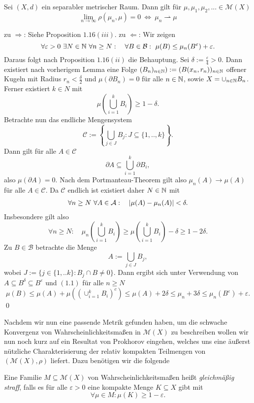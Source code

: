 \begin{theorem}
    Sei $(X,d)$ ein separabler metrischer Raum. Dann gilt für $\mu, \mu_1, \mu_2, ... \in \mathcal{M}(X)$
    $$
        \lim_{n \to \infty} \rho(\mu_n, \mu) = 0 \ \iff \ \mu_n \rightharpoonup \mu 
    $$
\end{theorem}

\begin{proof*}
    zu $\Rightarrow$: Siehe Proposition $1.16(iii)$.
    \newline 
    zu $\Leftarrow$:  Wir zeigen
    $$
        \forall \varepsilon > 0 \ \exists N \in \N \ \forall n \geq N: \quad \forall B \in \mathcal{B}: \  \mu(B) \leq \mu_n(B^{\varepsilon}) + \varepsilon. 
    $$
    Daraus folgt nach Proposition $1.16(ii)$ die Behauptung. Sei $\delta := \frac{\varepsilon}{4} > 0$. 
    Dann existiert nach vorherigem Lemma eine Folge $(B_n)_{n \in \mathbb{N}}) := (B(x_n, r_n))_{n \in \mathbb{N}}$ offener Kugeln mit Radius $r_n < \frac{\delta}{2}$  
    und $\mu(\partial B_n) = 0$ für alle $n \in \mathbb{N}$, sowie $X = \cup_{n \in  \mathbb{N}}B_n$. Ferner existiert $k \in N$ mit
    $$
        \mu\left(\bigcup_{i=1}^k B_i\right) \geq 1 - \delta. 
    $$
    Betrachte nun das endliche Mengensystem 
    $$
        \mathcal{C} := \left\{ \bigcup_{j \in J}B_j : J \subseteq \{1,..,k\}\right\}. 
    $$
    Dann gilt für alle $A \in \mathcal{C}$
    $$
        \partial A \subseteq \bigcup_{i=1}^k \partial B_i,
    $$
    also $\mu(\partial A) = 0$. Nach dem Portmanteau-Theorem gilt also $\mu_n(A) \to \mu(A)$ für alle $A \in \mathcal{C}$. Da $\mathcal{C}$ endlich ist existiert daher $N \in \mathbb{N}$ mit
    \begin{align}
        \forall n \geq N \ \forall A \in \mathcal{A}: \quad \left| \mu(A) - \mu_n(A) \right| < \delta. 
    \end{align}
    Insbesondere gilt also
    $$
        \forall n \geq N: \quad \mu_n\left(\bigcup_{i=1}^k B_i\right) \geq \mu\left(\bigcup_{i=1}^k B_i\right) - \delta \geq 1 - 2\delta. 
    $$
    Zu $B \in \mathcal{B}$ betrachte die Menge 
    $$
        A := \bigcup_{j \in J} B_j,
    $$
    wobei $J := \{j \in \{1,..k\}: B_j \cap B \neq 0 \}$. Dann ergibt sich unter Verwendung von $A \subseteq B^{\delta} \subseteq B^{\varepsilon}$ und $(1.1)$ für alle $n \geq N$ 
    $$
        \mu(B) \leq \mu(A) + \mu\left((\cup_{i=1}^k B_i)^c\right) \leq \mu(A) + 2\delta \leq \mu_n + 3\delta \leq \mu_n(B^{\varepsilon}) + \varepsilon. 
    $$
    \qed
    
\end{proof*}
Nachdem wir nun eine passende Metrik gefunden haben, um die schwache Konvergenz von Wahrscheinlichkeitsmaßen in $\mathcal{M}(X)$ zu beschreiben wollen wir nun noch kurz auf ein Resultat von Prokhorov eingehen, 
welches uns eine äußerst nützliche Charakterisierung der relativ kompakten Teilmengen von $(\mathcal{M}(X), \rho)$ liefert. 
Dazu benötigen wir die folgende 
\begin{mydef}
    Eine Familie $M \subseteq \mathcal{M}(X)$ von Wahrscheinlichkeitsmaßen heißt \textit{gleichmäßig straff}, 
    falls es für alle $\varepsilon > 0$ eine kompakte Menge $K \subseteq X$ gibt mit 
    $$
        \forall \mu \in M: \mu(K) \geq 1-\varepsilon. 
    $$
\end{mydef}

